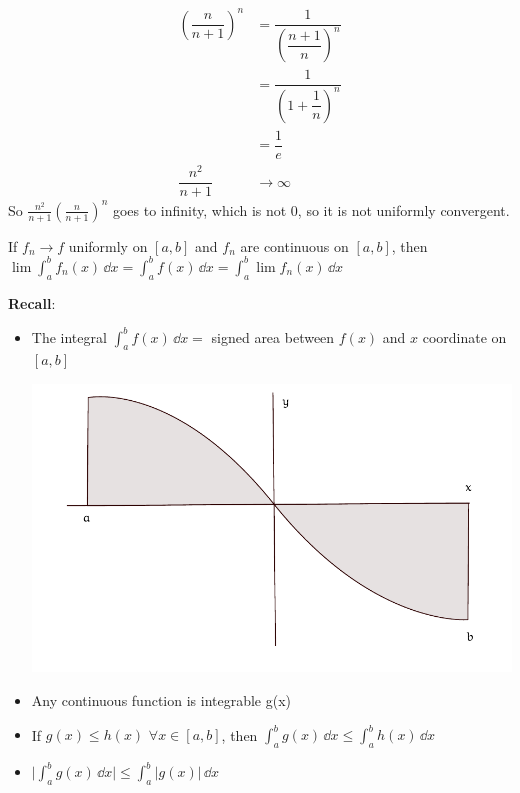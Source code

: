 \documentclass{report}
\begin{document}
\begin{examples}
\begin{example}
            \begin{align*}
                (\dfrac{n}{n + 1})^{n} &=           \dfrac{1}{(\dfrac{n + 1}{n})^{n}} \\
                                       &=           \dfrac{1}{(1 + \dfrac{1}{n})^{n}} \\
                                       &=           \dfrac{1}{e}                      \\
                \dfrac{n^{2}}{n + 1}   &\rightarrow  \infty                             
            \end{align*}
         So $\frac{n^{2}}{n + 1}(\frac{n}{n + 1})^{n}$ goes to infinity, which is not $0$, so it is not uniformly convergent.
    \end{example} 
\end{examples}

\begin{theorem}{25.2}
    If $f_{n} \rightarrow f$ uniformly on $[a, b]$ and $f_{n}$ are continuous on $[a, b]$, then $\lim \int_{a}^{b} f_{n}(x) \, \dd{x}  = \int_{a}^{b} f(x) \, \dd{x} = \int_{a}^{b} \lim f_{n}(x) \, \dd{x}$
\end{theorem}

\textbf{Recall}:
    \begin{itemize}
        \item The integral $\int_{a}^{b} f(x) \, \dd{x} =$ signed area between $f(x)$ and $x$ coordinate on $[a, b]$
            \begin{center}
                \includegraphics[scale = 0.9]{integralpic}
            \end{center}

        \item Any continuous function is integrable
        g(x)
        \item If $g(x) \leq h(x)$ $\forall x \in [a, b]$, then $\int_{a}^{b} g(x) \, \dd{x}  \leq \int_{a}^{b} h(x) \, \dd{x} $ 

        \item $\lvert \int_{a}^{b} g(x) \, \dd{x}  \rvert \leq \int_{a}^{b} \lvert g(x) \rvert  \, \dd{x}$
    \end{itemize}
\end{document}
